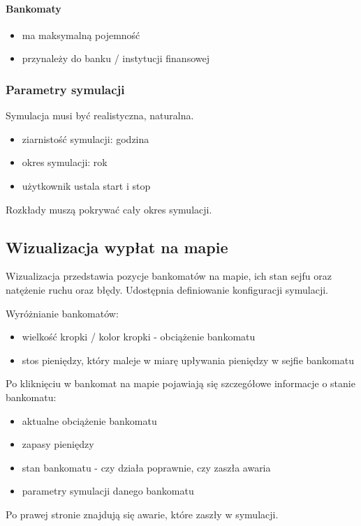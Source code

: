 \paragraph{Bankomaty}\label{bankomaty}

\begin{itemize}
\tightlist
\item
  ma maksymalną pojemność
\item
  przynależy do banku / instytucji finansowej
\end{itemize}

\subsubsection{Parametry symulacji}\label{parametry-symulacji}

Symulacja musi być realistyczna, naturalna.

\begin{itemize}
\tightlist
\item
  ziarnistość symulacji: godzina
\item
  okres symulacji: rok
\item
  użytkownik ustala start i stop
\end{itemize}

Rozkłady muszą pokrywać cały okres symulacji.

\subsection{Wizualizacja wypłat na mapie}\label{wizualizacja-wypux142at-na-mapie}

Wizualizacja przedstawia pozycje bankomatów na mapie, ich stan sejfu oraz natężenie ruchu oraz błędy.
Udostępnia definiowanie konfiguracji symulacji.

Wyróżnianie bankomatów:

\begin{itemize}
\tightlist
\item
  wielkość kropki / kolor kropki - obciążenie bankomatu
\item
  stos pieniędzy, który maleje w miarę upływania pieniędzy w sejfie bankomatu
\end{itemize}

Po kliknięciu w bankomat na mapie pojawiają się szczegółowe informacje o stanie bankomatu:

\begin{itemize}
\tightlist
\item
  aktualne obciążenie bankomatu
\item
  zapasy pieniędzy
\item
  stan bankomatu - czy działa poprawnie, czy zaszła awaria
\item
  parametry symulacji danego bankomatu
\end{itemize}

Po prawej stronie znajdują się awarie, które zaszły w symulacji.
